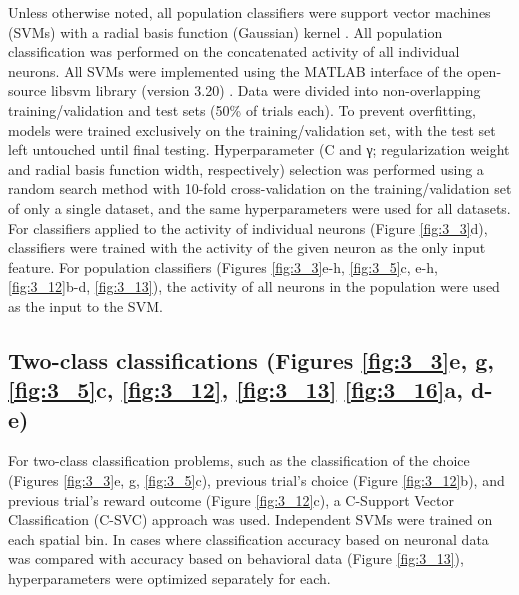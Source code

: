 Unless otherwise noted, all population classifiers were support vector machines (SVMs) with a radial basis function (Gaussian) kernel \citep{Murphy:2012uq, Smola:1997uw}. All population classification was performed on the concatenated activity of all individual neurons. All SVMs were implemented using the MATLAB interface of the open-source libsvm library (version 3.20) \citep{Chang:2011ta}. Data were divided into non-overlapping training/validation and test sets (50\% of trials each). To prevent overfitting, models were trained exclusively on the training/validation set, with the test set left untouched until final testing. Hyperparameter (C and γ; regularization weight and radial basis function width, respectively) selection was performed using a random search method with 10-fold cross-validation on the training/validation set of only a single dataset, and the same hyperparameters were used for all datasets. For classifiers applied to the activity of individual neurons (Figure \ref{fig:3_3}d), classifiers were trained with the activity of the given neuron as the only input feature. For population classifiers (Figures \ref{fig:3_3}e-h, \ref{fig:3_5}c, e-h, \ref{fig:3_12}b-d, \ref{fig:3_13}), the activity of all neurons in the population were used as the input to the SVM.

\subsection[Two-class classifications]{Two-class classifications (Figures \ref{fig:3_3}e, g, \ref{fig:3_5}c, \ref{fig:3_12}, \ref{fig:3_13} \ref{fig:3_16}a, d-e)} \label{methods:two_class_classifications}
For two-class classification problems, such as the classification of the choice (Figures \ref{fig:3_3}e, g, \ref{fig:3_5}c), previous trial’s choice (Figure \ref{fig:3_12}b), and previous trial’s reward outcome (Figure \ref{fig:3_12}c), a C-Support Vector Classification (C-SVC) approach was used. Independent SVMs were trained on each spatial bin. In cases where classification accuracy based on neuronal data was compared with accuracy based on behavioral data (Figure \ref{fig:3_13}), hyperparameters were optimized separately for each. 


